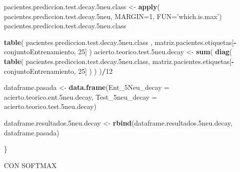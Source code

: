 \documentclass[]{article}
\newenvironment{Shaded}{\begin{snugshade}}{\end{snugshade}}
\newcommand{\KeywordTok}[1]{\textcolor[rgb]{0.13,0.29,0.53}{\textbf{#1}}}
\newcommand{\DataTypeTok}[1]{\textcolor[rgb]{0.13,0.29,0.53}{#1}}
\newcommand{\DecValTok}[1]{\textcolor[rgb]{0.00,0.00,0.81}{#1}}
\newcommand{\StringTok}[1]{\textcolor[rgb]{0.31,0.60,0.02}{#1}}
\newcommand{\OperatorTok}[1]{\textcolor[rgb]{0.81,0.36,0.00}{\textbf{#1}}}
\newcommand{\NormalTok}[1]{#1}
\begin{document}
\begin{Shaded}
\begin{Highlighting}[]
\NormalTok{  pacientes.prediccion.test.decay.5neu.class <-}\StringTok{ }\KeywordTok{apply}\NormalTok{( pacientes.prediccion.test.decay.5neu, }\DataTypeTok{MARGIN=}\DecValTok{1}\NormalTok{, }\DataTypeTok{FUN=}\StringTok{'which.is.max'}\NormalTok{)}
\NormalTok{  pacientes.prediccion.test.decay.5neu.class}
  
  \KeywordTok{table}\NormalTok{( pacientes.prediccion.test.decay.5neu.class , matriz.pacientes.etiquetas[}\OperatorTok{-}\NormalTok{conjuntoEntrenamiento, }\DecValTok{25}\NormalTok{] )}
\NormalTok{  acierto.teorico.test.5neu.decay <-}\StringTok{ }\KeywordTok{sum}\NormalTok{( }\KeywordTok{diag}\NormalTok{( }\KeywordTok{table}\NormalTok{( pacientes.prediccion.test.decay.5neu.class, matriz.pacientes.etiquetas[}\OperatorTok{-}\NormalTok{conjuntoEntrenamiento, }\DecValTok{25}\NormalTok{] ) ) )}\OperatorTok{/}\DecValTok{12}
  
  
\NormalTok{  dataframe.pasada <-}\StringTok{ }\KeywordTok{data.frame}\NormalTok{(}\DataTypeTok{Ent_5Neu_decay =}\NormalTok{ acierto.teorico.ent.5neu.decay,}
                                 \DataTypeTok{Test_5neu_decay =}\NormalTok{ acierto.teorico.test.5neu.decay)}
  
\NormalTok{  dataframe.resultados.5neu.decay <-}\StringTok{ }\KeywordTok{rbind}\NormalTok{(dataframe.resultados.5neu.decay, dataframe.pasada)}
  
\NormalTok{\}}
\end{Highlighting}
\end{Shaded}

CON SOFTMAX
\end{document}
